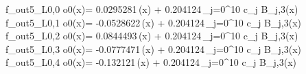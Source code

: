 f_{out5_L0,0	o0}(x)= 0.0295281\,\phi(x) + 0.204124\,\sum_{j=0}^{10} c_j B_{j,3}(x)
f_{out5_L0,1	o0}(x)= -0.0528622\,\phi(x) + 0.204124\,\sum_{j=0}^{10} c_j B_{j,3}(x)
f_{out5_L0,2	o0}(x)= 0.0844493\,\phi(x) + 0.204124\,\sum_{j=0}^{10} c_j B_{j,3}(x)
f_{out5_L0,3	o0}(x)= -0.0777471\,\phi(x) + 0.204124\,\sum_{j=0}^{10} c_j B_{j,3}(x)
f_{out5_L0,4	o0}(x)= -0.132121\,\phi(x) + 0.204124\,\sum_{j=0}^{10} c_j B_{j,3}(x)

